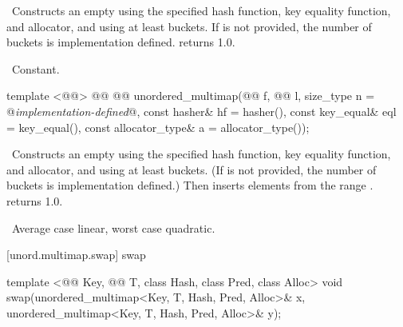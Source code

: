 \documentclass[american,twoside]{book}
\begin{document}
\begin{itemdescr}
\pnum
\effects\ Constructs an empty  using the
specified hash function, key equality function, and allocator, and
using at least \textit{} buckets.  If \textit{} is not
provided, the number of buckets is implementation defined.
 returns 1.0.

\pnum
\complexity\ Constant.
\end{itemdescr}

%
\begin{itemdecl}
template <@@>
  @@
          @@
  unordered_multimap(@@ f, @@ l,
                     size_type n = @\textit{implementation-defined}@,
                     const hasher& hf = hasher(),
                     const key_equal& eql = key_equal(),
                     const allocator_type& a = allocator_type());
\end{itemdecl}

\begin{itemdescr}
\pnum
\effects\ Constructs an empty  using the
specified hash function, key equality function, and allocator, and
using at least \textit{} buckets.  (If \textit{} is not
provided, the number of buckets is implementation defined.)  Then
inserts elements from the range \tcode{[\textit{f}, \textit{l})}.
 returns 1.0.

\pnum
\complexity\ Average case linear, worst case quadratic.
\end{itemdescr}

[unord.multimap.swap]{ swap}

%
%
\begin{itemdecl}
template <@@ Key, @@ T, class Hash, class Pred, class Alloc>
  void swap(unordered_multimap<Key, T, Hash, Pred, Alloc>& x,
            unordered_multimap<Key, T, Hash, Pred, Alloc>& y);
\end{itemdecl}
\end{document}
